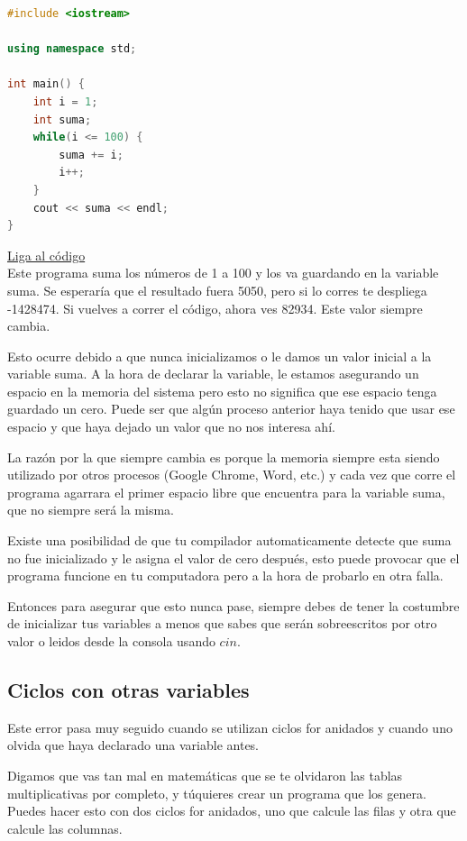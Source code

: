 \documentclass{article}
\begin{document}
\begin{lstlisting}[language=C++, caption=Error de inicialización]
#include <iostream>

using namespace std;

int main() {
    int i = 1;
    int suma;
    while(i <= 100) {
        suma += i;
        i++;
    }
    cout << suma << endl;
}
\end{lstlisting}
\href{https://repl.it/@Jamesscn/Suma-Imposible}{Liga al código}\\

Este programa suma los números de 1 a 100 y los va guardando en la variable suma. Se esperaría que el resultado fuera 5050, pero si lo corres te despliega -1428474. Si vuelves a correr el código, ahora ves 82934. Este valor siempre cambia.

Esto ocurre debido a que nunca inicializamos o le damos un valor inicial a la variable suma. A la hora de declarar la variable, le estamos asegurando un espacio en la memoria del sistema pero esto no significa que ese espacio tenga guardado un cero. Puede ser que algún proceso anterior haya tenido que usar ese espacio y que haya dejado un valor que no nos interesa ahí.

La razón por la que siempre cambia es porque la memoria siempre esta siendo utilizado por otros procesos (Google Chrome, Word, etc.) y cada vez que corre el programa agarrara el primer espacio libre que encuentra para la variable suma, que no siempre será la misma.

Existe una posibilidad de que tu compilador automaticamente detecte que suma no fue inicializado y le asigna el valor de cero después, esto puede provocar que el programa funcione en tu computadora pero a la hora de probarlo en otra falla.

Entonces para asegurar que esto nunca pase, siempre debes de tener la costumbre de inicializar tus variables a menos que sabes que serán sobreescritos por otro valor o leidos desde la consola usando $cin$.

\subsection{Ciclos con otras variables}
Este error pasa muy seguido cuando se utilizan ciclos for anidados y cuando uno olvida que haya declarado una variable antes.

Digamos que vas tan mal en matemáticas que se te olvidaron las tablas multiplicativas por completo, y túquieres crear un programa que los genera. Puedes hacer esto con dos ciclos for anidados, uno que calcule las filas y otra que calcule las columnas.
\end{document}
